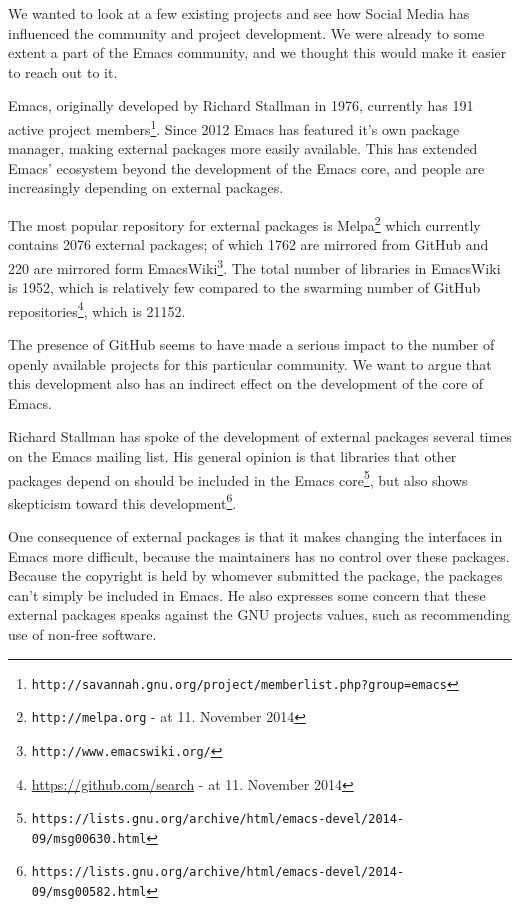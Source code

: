 \documentclass[a4paper,11pt]{article} %
\begin{document}
We wanted to look at a few existing projects and see how Social Media has
influenced the community and project development. We were already to some
extent a part of the Emacs community, and we thought this would make it
easier to reach out to it.

Emacs, originally developed by Richard Stallman in 1976, currently has
\num{191} active project
members\footnote{\texttt{http://savannah.gnu.org/project/memberlist.php?group=emacs}}.
Since \num{2012} Emacs has featured it's own package manager, making
external packages more easily available. This has extended Emacs' ecosystem
beyond the development of the Emacs core, and people are increasingly
depending on external packages.

The most popular repository for external packages is
Melpa\footnote{\texttt{http://melpa.org} - at 11. November 2014} which
currently contains \num{2076} external packages; of which \num{1762} are
mirrored from GitHub and \num{220} are mirrored form
EmacsWiki\footnote{\texttt{http://www.emacswiki.org/}}. The total number of
libraries in EmacsWiki is \num{1952}, which is relatively few compared to
the swarming number of GitHub
repositories\footnote{\href{https://github.com/search?utf8=\%E2\%9C\%93\&q=language\%3Aemacs-lisp\&type=Repositories\&ref=searchresults}{https://github.com/search}
  - at 11. November 2014}, which is \num{21152}.

The presence of GitHub seems to have made a serious impact to the number of
openly available projects for this particular community. We want to argue
that this development also has an indirect effect on the development of the
core of Emacs.

Richard Stallman has spoke of the development of external packages several
times on the Emacs mailing list. His general opinion is that libraries that
other packages depend on should be included in the Emacs
core\footnote{\texttt{https://lists.gnu.org/archive/html/emacs-devel/2014-09/msg00630.html}},
but also shows skepticism toward this
development\footnote{\texttt{https://lists.gnu.org/archive/html/emacs-devel/2014-09/msg00582.html}}.

One consequence of external packages is that it makes changing the
interfaces in Emacs more difficult, because the maintainers has no control
over these packages. Because the copyright is held by whomever submitted the
package, the packages can't simply be included in Emacs. He also expresses
some concern that these external packages speaks against the GNU projects
values, such as recommending use of non-free software.
\end{document}
